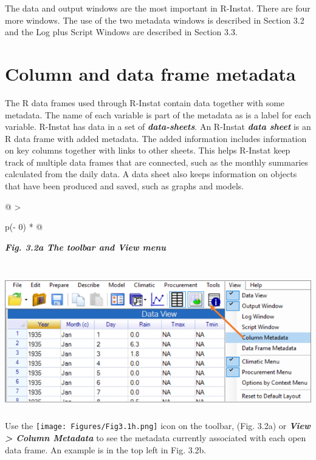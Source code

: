 \documentclass[
  letterpaper,
  DIV=11,
  numbers=noendperiod]{scrreprt}
\begin{document}
The data and output windows are the most important in R-Instat. There
are four more windows. The use of the two metadata windows is described
in Section 3.2 and the Log plus Script Windows are described in Section
3.3.

\section{Column and data frame
metadata}\label{column-and-data-frame-metadata}

The R data frames used through R-Instat contain data together with some
metadata. The name of each variable is part of the metadata as is a
label for each variable. R-Instat has data in a set of
\textbf{\emph{data-sheets}}. An R-Instat \textbf{\emph{data sheet}} is
an R data frame with added metadata. The added information includes
information on key columns together with links to other sheets. This
helps R-Instat keep track of multiple data frames that are connected,
such as the monthly summaries calculated from the daily data. A data
sheet also keeps information on objects that have been produced and
saved, such as graphs and models.

\begin{longtable}[]{@{}
  >{\raggedright\arraybackslash}p{(\columnwidth - 0\tabcolsep) * }@{}}
\toprule\noalign{}
\begin{minipage}[b]{\linewidth}\raggedright
\textbf{\emph{Fig. 3.2a The toolbar and View menu}}
\end{minipage} \\
\midrule\noalign{}
\endhead
\bottomrule\noalign{}
\endlastfoot
\includegraphics[width=5.88428in,height=2.32151in]{figures/Fig3.2a.png} \\
\end{longtable}

Use the
\texttt{[image: Figures/Fig3.1h.png]}
icon on the toolbar, (Fig. 3.2a) or \textbf{\emph{View \textgreater{}
Column Metadata}} to see the metadata currently associated with each
open data frame. An example is in the top left in Fig. 3.2b.
\end{document}

